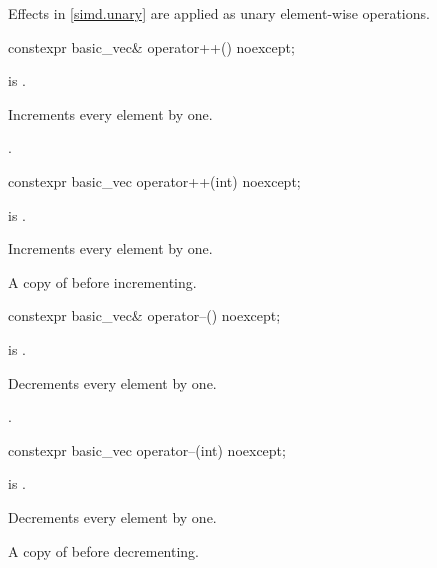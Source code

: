 \pnum
Effects in \ref{simd.unary} are applied as unary element-wise operations.

\begin{itemdecl}
constexpr basic_vec& operator++() noexcept;
\end{itemdecl}

\begin{itemdescr}
\pnum
\constraints
{} is .

\pnum
\effects
Increments every element by one.

\pnum
\returns
{}.
\end{itemdescr}

\begin{itemdecl}
constexpr basic_vec operator++(int) noexcept;
\end{itemdecl}

\begin{itemdescr}
\pnum
\constraints
{} is .

\pnum
\effects
Increments every element by one.

\pnum
\returns
A copy of  before incrementing.
\end{itemdescr}

\begin{itemdecl}
constexpr basic_vec& operator--() noexcept;
\end{itemdecl}

\begin{itemdescr}
\pnum
\constraints
{} is .

\pnum
\effects
Decrements every element by one.

\pnum
\returns
{}.
\end{itemdescr}

\begin{itemdecl}
constexpr basic_vec operator--(int) noexcept;
\end{itemdecl}

\begin{itemdescr}
\pnum
\constraints
{} is .

\pnum
\effects
Decrements every element by one.

\pnum
\returns
A copy of  before decrementing.
\end{itemdescr}

